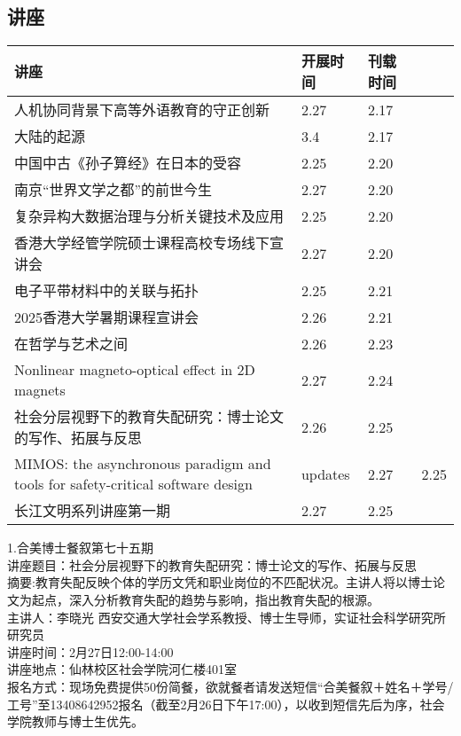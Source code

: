 \documentclass[letterpaper, 12pt]{article}
\begin{document}
\begin{multicols}{2}

\section{讲座}
\begin{tabular}{|>{\centering\arraybackslash}m{}|m{}|m{}|}
    \hline
    讲座 & 开展时间 & 刊载时间\\
    \hline\hline

  人机协同背景下高等外语教育的守正创新 & 2.27 & 2.17\\\hline
    大陆的起源 & 3.4 & 2.17\\\hline
    中国中古《孙子算经》在日本的受容 & 2.25 & 2.20\\\hline
    南京“世界文学之都”的前世今生 & 2.27 & 2.20\\\hline
    复杂异构大数据治理与分析关键技术及应用 & 2.25 & 2.20\\\hline
    香港大学经管学院硕士课程高校专场线下宣讲会 & 2.27 & 2.20\\\hline
    电子平带材料中的关联与拓扑 & 2.25 & 2.21\\\hline
    2025香港大学暑期课程宣讲会 & 2.26 & 2.21\\\hline
    在哲学与艺术之间 & 2.26 & 2.23\\\hline
    Nonlinear magneto-optical effect in 2D magnets & 2.27&2.24\\\hline
    社会分层视野下的教育失配研究：博士论文的写作、拓展与反思 & 2.26 & 2.25\\\hline
    MIMOS: the asynchronous paradigm and tools for safety-critical software design&updates & 2.27 & 2.25\\\hline
    长江文明系列讲座第一期 & 2.27 & 2.25\\\hline
    \hline
\end{tabular}
1.合美博士餐叙第七十五期\\
讲座题目：社会分层视野下的教育失配研究：博士论文的写作、拓展与反思\\
摘要:教育失配反映个体的学历文凭和职业岗位的不匹配状况。主讲人将以博士论文为起点，深入分析教育失配的趋势与影响，指出教育失配的根源。\\
主讲人：李晓光 西安交通大学社会学系教授、博士生导师，实证社会科学研究所研究员\\
讲座时间：2月27日12:00-14:00\\
讲座地点：仙林校区社会学院河仁楼401室\\
报名方式：现场免费提供50份简餐，欲就餐者请发送短信“合美餐叙＋姓名＋学号/工号”至13408642952报名（截至2月26日下午17:00），以收到短信先后为序，社会学院教师与博士生优先。\\



\end{multicols}
\end{document}

